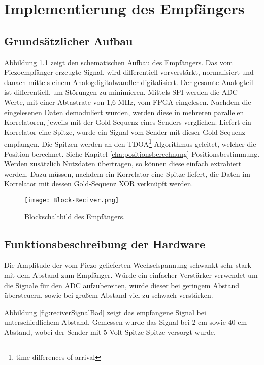 \chapter{Implementierung des Empfängers}
\label{cha:implementierungReciver}

\section{Grundsätzlicher Aufbau}
Abbildung \ref{fig:BlockReciver} zeigt den schematischen Aufbau des Empfängers. Das vom Piezoempfänger erzeugte Signal, wird differentiell vorverstärkt, normalisiert und danach mittels einem Analogdigitalwandler digitalisiert. Der gesamte Analogteil ist differentiell, um Störungen zu minimieren. Mittels SPI werden die ADC Werte, mit einer Abtastrate von 1,6 MHz, vom FPGA eingelesen. Nachdem die eingelesenen Daten demoduliert wurden, werden diese in mehreren parallelen Korrelatoren, jeweils mit der Gold Sequenz eines Senders verglichen. Liefert ein Korrelator eine Spitze, wurde ein Signal vom Sender mit dieser Gold-Sequenz empfangen. Die Spitzen werden an den TDOA\footnote{time differences of arrival} Algorithmus geleitet, welcher die Position berechnet. Siehe Kapitel \ref{cha:positionsberechnung} Positionsbestimmung. Werden zusätzlich Nutzdaten übertragen, so können diese einfach extrahiert werden. Dazu müssen, nachdem ein Korrelator eine Spitze liefert, die Daten im Korrelator mit dessen Gold-Sequenz XOR verknüpft werden.

\begin{figure}[H]
\centering
\texttt{[image: Block-Reciver.png]}
\caption{Blockschaltbild des Empfängers.}
\label{fig:BlockReciver}
\end{figure}

\section{Funktionsbeschreibung der Hardware}
Die Amplitude der vom Piezo gelieferten Wechselspannung schwankt sehr stark mit dem Abstand zum Empfänger. Würde ein einfacher Verstärker verwendet um die Signale für den ADC aufzubereiten, würde dieser bei geringem Abstand übersteuern, sowie bei großem Abstand viel zu schwach verstärken. 

Abbildung \ref{fig:reciverSignalBad} zeigt das empfangene Signal bei unterschiedlichem Abstand. Gemessen wurde das Signal bei 2 cm sowie 40 cm Abstand, wobei der Sender mit 5 Volt Spitze-Spitze versorgt wurde. 

